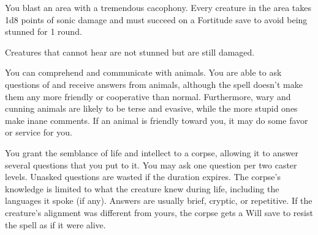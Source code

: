 \begin{multicols}{2}
\begin{small}

\noindent You blast an area with a tremendous cacophony. Every creature in the area takes 1d8 points of sonic damage and must succeed on a Fortitude save to avoid being stunned for 1 round. 

\smallskip\noindent Creatures that cannot hear are not stunned but are still damaged.


\noindent You can comprehend and communicate with animals. You are able to ask questions of and receive answers from animals, although the spell doesn't make them any more friendly or cooperative than normal. Furthermore, wary and cunning animals are likely to be terse and evasive, while the more stupid ones make inane comments. If an animal is friendly toward you, it may do some favor or service for you.

\noindent You grant the semblance of life and intellect to a corpse, allowing it to answer several questions that you put to it. You may ask one question per two caster levels. Unasked questions are wasted if the duration expires. The corpse's knowledge is limited to what the creature knew during life, including the languages it spoke (if any). Answers are usually brief, cryptic, or repetitive. If the creature's alignment was different from yours, the corpse gets a Will save to resist the spell as if it were alive.


\end{small}
\end{multicols}
